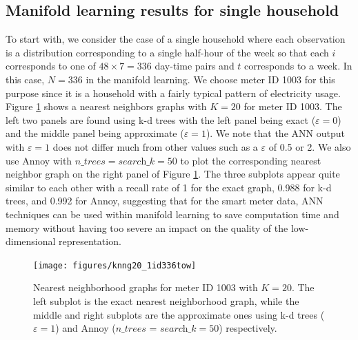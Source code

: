 \documentclass[11pt,a4paper,]{article}
\begin{document}
\hypertarget{electricityresults}{%
\subsection{Manifold learning results for single household}\label{electricityresults}}

To start with, we consider the case of a single household where each observation is a distribution corresponding to a single half-hour of the week so that each \(i\) corresponds to one of \(48 \times 7 = 336\) day-time pairs and \(t\) corresponds to a week. In this case, \(N=336\) in the manifold learning. We choose meter ID 1003 for this purpose since it is a household with a fairly typical pattern of electricity usage. Figure \ref{fig:neighborplot} shows a nearest neighbors graphs with \(K=20\) for meter ID 1003. The left two panels are found using k-d trees with the left panel being exact (\(\varepsilon = 0\)) and the middle panel being approximate (\(\varepsilon = 1\)).
We note that the ANN output with \(\varepsilon = 1\) does not differ much from other values such as a \(\varepsilon\) of 0.5 or 2. We also use Annoy with \(\textit{n\_trees}=\textit{search\_k}=50\) to plot the corresponding nearest neighbor graph on the right panel of Figure \ref{fig:neighborplot}.
The three subplots appear quite similar to each other with a recall rate of 1 for the exact graph, 0.988 for k-d trees, and 0.992 for Annoy, suggesting that for the smart meter data, ANN techniques can be used within manifold learning to save computation time and memory without having too severe an impact on the quality of the low-dimensional representation.

\begin{figure}

{\centering \texttt{[image: figures/knng20\_1id336tow]} 

}

\caption{Nearest neighborhood graphs for meter ID 1003 with $K=20$. The left subplot is the exact nearest neighborhood graph, while the middle and right subplots are the approximate ones using k-d trees ($\varepsilon = 1$) and Annoy ($\textit{n\_trees = search\_k}=50$) respectively.}\label{fig:neighborplot}
\end{figure}
\end{document}
